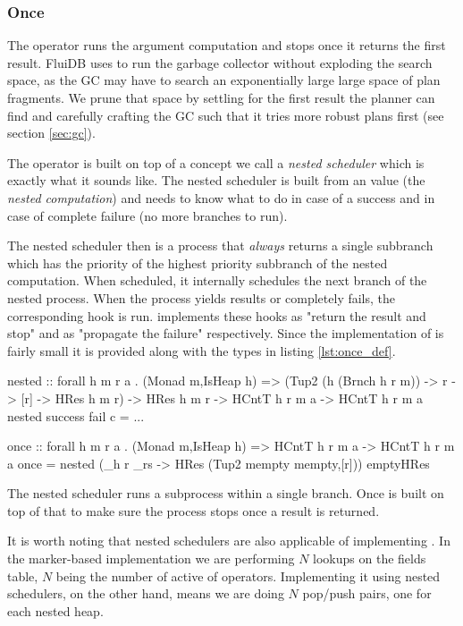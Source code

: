 \subsubsection{Once}

The  operator runs the argument computation and stops once it
returns the first result. FluiDB uses  to run the garbage
collector without exploding the search space, as the GC may have to search 
an exponentially large large space of plan fragments. We prune that
space by settling for the first result the planner can find and carefully crafting
the GC such that it tries more robust plans first (see section \ref{sec:gc}).

The  operator is built on top of a concept we call a
\emph{nested scheduler} which is exactly what it sounds like.
The nested scheduler is built from an  value (the \emph{nested computation}) 
and needs to know what to do in case of a success and
in case of complete failure (no more branches to run). 

The nested scheduler then is a process that \emph{always} returns a single
subbranch which has the priority of the highest priority
subbranch of the nested computation. When scheduled, it internally
schedules the next branch of the nested process. When the process
yields results or completely fails, the corresponding hook is
run.  implements these hooks as "return the result and
stop" and as "propagate the failure" respectively. Since the
implementation of  is fairly small it is provided along
with the types in listing \ref{lst:once_def}.

\begin{code}
\begin{haskellcode}
nested
  :: forall h m r a .
  (Monad m,IsHeap h)
  => (Tup2 (h (Brnch h r m)) -> r -> [r] -> HRes h m r)
  -> HRes h m r
  -> HCntT h r m a
  -> HCntT h r m a
nested success fail c = ...

once :: forall h m r a . (Monad m,IsHeap h) => HCntT h r m a -> HCntT h r m a
once = nested (\_h r _rs -> HRes (Tup2 mempty mempty,[r])) emptyHRes
\end{haskellcode}
\caption{\label{lst:once_def}The nested scheduler runs a subprocess within a single branch. Once is built on top of that to make sure the process stops once a result is returned.}
\end{code}

It is worth noting that nested schedulers are also applicable of
implementing \hask{<//>}. In the marker-based implementation we are
performing \(N\) lookups on the fields table, \(N\) being the number of active
of \hask{<//>} operators. Implementing it using nested schedulers, on the
other hand, means we are doing \(N\) pop/push pairs, one for each
nested heap.

